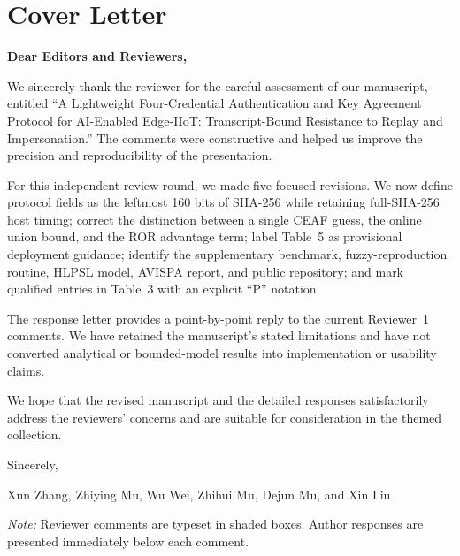 \thispagestyle{empty}
{}

\section*{\textbf{Cover Letter}}

\noindent\textbf{Dear Editors and Reviewers,}

We sincerely thank the reviewer for the careful assessment of our manuscript, entitled ``A Lightweight Four-Credential Authentication and Key Agreement Protocol for AI-Enabled Edge-IIoT: Transcript-Bound Resistance to Replay and Impersonation.'' The comments were constructive and helped us improve the precision and reproducibility of the presentation.

For this independent review round, we made five focused revisions. We now define protocol fields as the leftmost 160 bits of SHA-256 while retaining full-SHA-256 host timing; correct the distinction between a single CEAF guess, the online union bound, and the ROR advantage term; label Table~5 as provisional deployment guidance; identify the supplementary benchmark, fuzzy-reproduction routine, HLPSL model, AVISPA report, and public repository; and mark qualified entries in Table~3 with an explicit ``P'' notation.

The response letter provides a point-by-point reply to the current Reviewer~1 comments. We have retained the manuscript's stated limitations and have not converted analytical or bounded-model results into implementation or usability claims.

We hope that the revised manuscript and the detailed responses satisfactorily address the reviewers' concerns and are suitable for consideration in the themed collection.

\vspace{3em}

\noindent Sincerely,

\noindent Xun Zhang, Zhiying Mu, Wu Wei, Zhihui Mu, Dejun Mu, and Xin Liu

\vfill
\noindent\textit{Note:} Reviewer comments are typeset in shaded boxes. Author responses are presented immediately below each comment.
